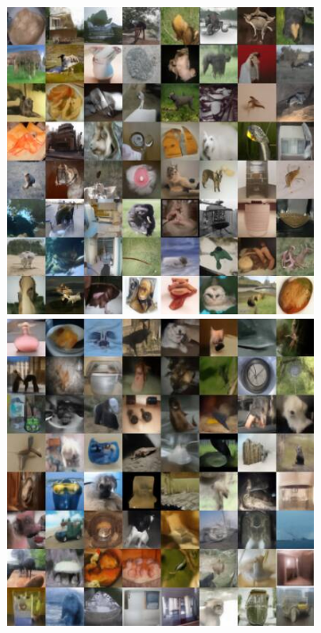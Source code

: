 \begin{figure}
  \begin{subfigure}{0.495\textwidth}
    \includegraphics[width=\linewidth]{figs/imgs/ddpm_glsddim_imagenet64_data_samples_T_700_10_steps.jpg}
    \includegraphics[width=\linewidth]{figs/imgs/ddpm_glsddim_imagenet64_data_samples_T_600_5_steps.jpg}

\end{subfigure}
\end{figure}
